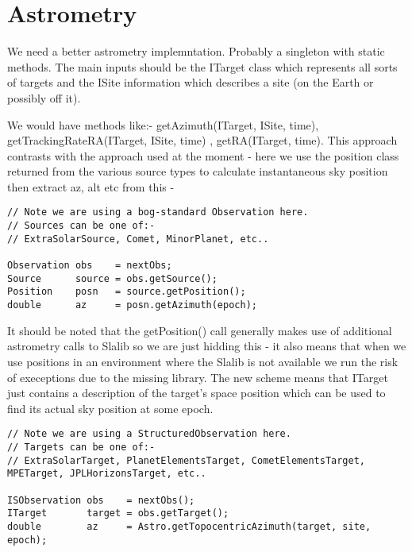 \section{Astrometry} 
We need a better astrometry implemntation. Probably a singleton with static methods. The main inputs should be the ITarget class which represents all sorts of targets and the ISite information which describes a site (on the Earth or possibly off it).

We would have methods like:- \textsf{getAzimuth(ITarget, ISite, time)}, \textsf{getTrackingRateRA(ITarget, ISite, time)} , \textsf{getRA(ITarget, time)}. This approach contrasts with the approach used at the moment - here we use the position class returned from the various source types to calculate instantaneous sky position then extract az, alt etc from this - 

\begin{verbatim}
// Note we are using a bog-standard Observation here.
// Sources can be one of:-
// ExtraSolarSource, Comet, MinorPlanet, etc..

Observation obs    = nextObs; 
Source      source = obs.getSource();       
Position    posn   = source.getPosition();
double      az     = posn.getAzimuth(epoch);
\end{verbatim}

It should be noted that the getPosition() call generally makes use of additional astrometry calls to Slalib so we are just hidding this - it also means that when we use positions in an environment where the Slalib is not available we run the risk of execeptions due to the missing library. The new scheme means that ITarget just contains a description of the target's space position which can be used to find its actual sky position at some epoch.

\begin{verbatim}
// Note we are using a StructuredObservation here.
// Targets can be one of:- 
// ExtraSolarTarget, PlanetElementsTarget, CometElementsTarget, MPETarget, JPLHorizonsTarget, etc..

ISObservation obs    = nextObs();
ITarget       target = obs.getTarget();      
double        az     = Astro.getTopocentricAzimuth(target, site, epoch);
\end{verbatim}
